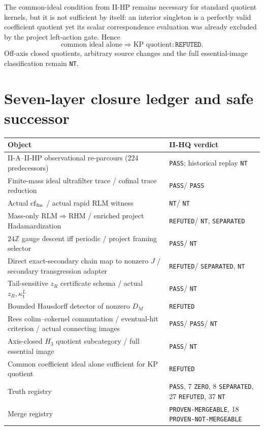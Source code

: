 \documentclass[10pt,a4paper]{article}
\newcommand{\PASS}{\texttt{PASS}}
\newcommand{\NT}{\texttt{NT}}
\newcommand{\REF}{\texttt{REFUTED}}
\newcommand{\ZERO}{\texttt{ZERO}}
\newcommand{\SEP}{\texttt{SEPARATED}}
\newcommand{\PM}{\texttt{PROVEN-MERGEABLE}}
\newcommand{\PNM}{\texttt{PROVEN-NOT-MERGEABLE}}
\newcommand{\Z}{\mathbb Z}
\newcommand{\cfm}{\operatorname{cf}_{\rm fm}}
\begin{document}
The common-ideal condition from II-HP remains necessary for standard quotient kernels, but it is not sufficient by itself: an interior singleton is a perfectly valid coefficient quotient yet its scalar correspondence evaluation was already excluded by the project left-action gate.  Hence
\[
\boxed{\text{common ideal alone}\Rightarrow\text{KP quotient}:\REF.}
\tag{21}
\]
Off-axis closed quotients, arbitrary source changes and the full essential-image classification remain \NT.

\section{Seven-layer closure ledger and safe successor}
\begin{center}\small
\begin{tabularx}{0.98\textwidth}{@{}>{\raggedright\arraybackslash}p{}>{\raggedright\arraybackslash}X@{}}
\toprule
Object & II-HQ verdict\\\midrule
II-A--II-HP observational re-parcours (224 predecessors) & \PASS; historical replay \NT\\
Finite-mass ideal ultrafilter trace / cofinal trace reduction & \PASS / \PASS\\
Actual $\cfm$ / actual rapid RLM witness & \NT / \NT\\
Mass-only RLM$\Rightarrow$RHM / enriched project Hadamardization & \REF / \NT, \SEP\\
$24\Z$ gauge descent iff periodic / project framing selector & \PASS / \NT\\
Direct exact-secondary chain map to nonzero $J$ / secondary transgression adapter & \REF / \SEP, \NT\\
Tail-sensitive $z_R$ certificate schema / actual $z_R,\kappa_1^L$ & \PASS / \NT\\
Bounded Hausdorff detector of nonzero $D_M$ & \REF\\
Rees colim--cokernel commutation / eventual-hit criterion / actual connecting images & \PASS / \PASS / \NT\\
Axis-closed $H_3$ quotient subcategory / full essential image & \PASS / \NT\\
Common coefficient ideal alone sufficient for KP quotient & \REF\\
Truth registry & 79 \PASS, 7 \ZERO, 8 \SEP, 27 \REF, 37 \NT\\
Merge registry & 18 \PM, 18 \PNM\\
\bottomrule
\end{tabularx}
\end{center}
\end{document}
